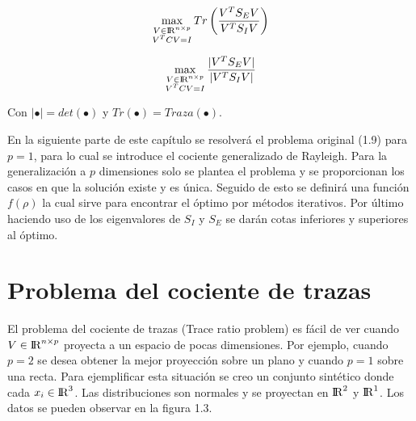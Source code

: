 \begin{equation} \label{eq:2.7}
	\max_{\substack{V \in {\rm I\!R}^{n \times p} \\ V^TC V = I}} Tr\left( \frac{V^T S_E V}{V^T S_I V}\right) 	
\end{equation}

\begin{equation} \label{eq:2.8}
	\max_{\substack{V \in {\rm I\!R}^{n \times p} \\ V^TC V = I}} \frac{|V^T S_E V|}{|V^T S_I V|} 	
\end{equation}

Con $|\bullet| = det(\bullet)$ y $Tr(\bullet) = Traza(\bullet)$.


En la siguiente parte de este capítulo se resolverá el problema original (1.9) para $p = 1$, para lo cual se introduce el cociente generalizado de Rayleigh. Para la generalización a $p$ dimensiones solo se plantea el problema y se proporcionan los casos en que la solución existe y es única. Seguido de esto se definirá una función $f(\rho)$ la cual sirve para encontrar el óptimo por métodos iterativos. Por último haciendo uso de los eigenvalores de $S_I$ y $S_E$ se darán cotas inferiores y superiores al óptimo.

\section{Problema del cociente de trazas}

El problema del cociente de trazas (Trace ratio problem) es fácil de ver cuando $V \in {\rm I\!R}^{n \times p}$ proyecta a un espacio de pocas dimensiones. Por ejemplo, cuando $p = 2$ se desea obtener la mejor proyección sobre un plano y cuando $p = 1$ sobre una recta. Para ejemplificar esta situación se creo un conjunto sintético donde cada $x_i \in {\rm I\!R}^{3}$. Las distribuciones son normales y se proyectan en ${\rm I\!R}^{2}$ y ${\rm I\!R}^{1}$. Los datos se pueden observar en la figura 1.3.

